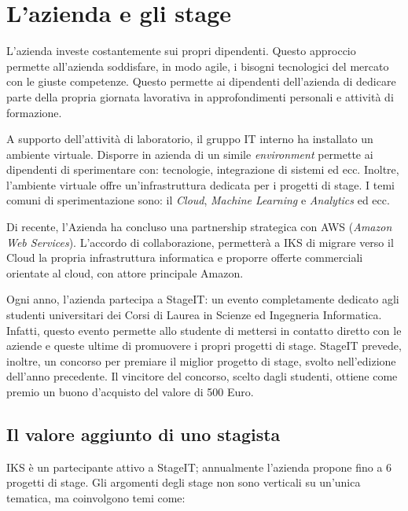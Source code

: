 
\chapter{L'azienda e gli stage}
\label{cap:stage}
\vspace{20pt}

L'azienda investe costantemente sui propri dipendenti. Questo approccio 
permette all'azienda  soddisfare, in modo agile, i bisogni tecnologici 
del mercato con le giuste competenze. 
Questo permette ai dipendenti dell'azienda di dedicare parte della 
propria giornata lavorativa in approfondimenti personali e attività 
di formazione. 

A supporto dell'attività di laboratorio, il gruppo IT interno ha installato 
un ambiente virtuale. Disporre in azienda di un simile \emph{environment} permette 
ai dipendenti di sperimentare con: tecnologie, integrazione di sistemi ed ecc. 
Inoltre, l'ambiente virtuale offre un'infrastruttura dedicata per i 
progetti di stage. I temi comuni di sperimentazione sono: il  \textit{Cloud}, 
\textit{Machine Learning} e \textit{Analytics} ed ecc. 

Di recente, l'Azienda ha concluso una partnership strategica con AWS 
(\textit{Amazon Web Services}). L'accordo di collaborazione, 
permetterà a IKS di migrare verso il Cloud la propria infrastruttura 
informatica e proporre offerte commerciali orientate al cloud, con attore principale 
Amazon. 

Ogni anno, l'azienda partecipa a StageIT: un evento completamente dedicato 
agli studenti universitari dei Corsi di Laurea in Scienze ed Ingegneria 
Informatica.
Infatti, questo evento permette  allo studente di mettersi in contatto diretto 
con le aziende e queste ultime di promuovere i propri progetti di stage. 
StageIT prevede, inoltre, un concorso per premiare il miglior progetto 
di stage, svolto nell'edizione dell'anno precedente. Il vincitore del concorso, 
scelto dagli studenti, ottiene come premio un buono d'acquisto del 
valore di 500 Euro.

\section{Il valore aggiunto di uno stagista}

IKS è un partecipante attivo a StageIT; annualmente l'azienda propone 
fino a 6 progetti di stage. Gli argomenti degli stage non sono verticali 
su un'unica tematica, ma coinvolgono temi come: 

